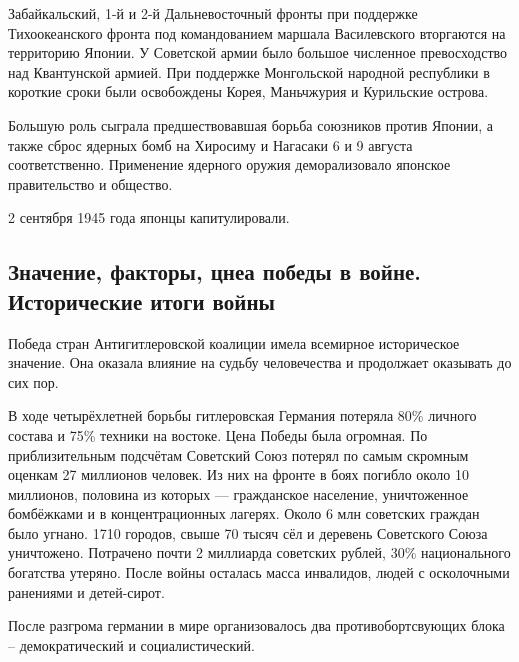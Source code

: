 Забайкальский, 1-й и 2-й Дальневосточный фронты при поддержке Тихоокеанского фронта под командованием маршала Василевского вторгаются на территорию Японии. У Советской армии было большое численное превосходство над Квантунской армией. При поддержке Монгольской народной республики в короткие сроки были освобождены Корея, Маньчжурия и Курильские острова.

Большую роль сыграла предшествовавшая борьба союзников против Японии, а также сброс ядерных бомб на Хиросиму и Нагасаки 6 и 9 августа соответственно. Применение ядерного оружия деморализовало японское правительство и общество.

2 сентября 1945 года японцы капитулировали.

\subsection{Значение, факторы, цнеа победы в войне. Исторические итоги войны}

Победа стран Антигитлеровской коалиции имела всемирное историческое значение. Она оказала влияние на судьбу человечества и продолжает оказывать до сих пор.

В ходе четырёхлетней борьбы гитлеровская Германия потеряла 80\% личного состава и 75\% техники на востоке. Цена Победы была огромная. По приблизительным подсчётам Советский Союз потерял по самым скромным оценкам 27 миллионов человек. Из них на фронте в боях погибло около 10 миллионов, половина из которых --- гражданское население, уничтоженное бомбёжками и в концентрационных лагерях. Около 6 млн советских граждан было угнано. 1710 городов, свыше 70 тысяч сёл и деревень Советского Союза уничтожено. Потрачено почти 2 миллиарда советских рублей, 30\% национального богатства утеряно. После войны осталась масса инвалидов, людей с осколочными ранениями и детей-сирот.

После разгрома германии в мире организовалось два противобортсвующих блока -- демократический и социалистический.